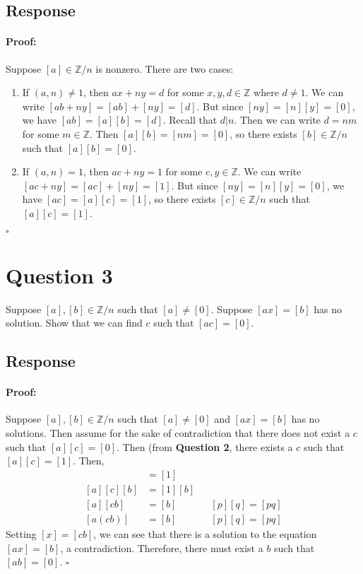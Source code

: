\documentclass [12pt] {article}
\newcommand{\Z}{\mathbb{Z}}
\newenvironment{proof}{\paragraph{Proof:}}{\hfill$\square$}
\begin{document}
\subsection*{Response}
\begin{proof}
    Suppose $[a] \in \Z/n$ is nonzero. There are two cases:
    \begin{enumerate}[label=\it{Case \roman*:},leftmargin=*]
        \item If $(a, n) \neq 1$, then $ax + ny = d$ for some $x, y, d \in \Z$ where $d \neq 1$. 
            We can write $[ab + ny] = [ab] + [ny] = [d]$. But since $[ny] = [n][y] = [0]$, we have
            $[ab] = [a][b] = [d]$. Recall that $d | n$. Then we can write $d = nm$ for some 
            $m \in \Z$. Then $[a][b] = [nm] = [0]$, so there exists $[b] \in \Z/n$ such that
            $[a][b] = [0]$.
        \item If $(a, n) = 1$, then $ac + ny = 1$ for some $c, y \in \Z$. We can write
            $[ac + ny] = [ac] + [ny] = [1]$. But since $[ny] = [n][y] = [0]$, we have
            $[ac] = [a][c] = [1]$, so there exists $[c] \in \Z/n$ such that $[a][c] = [1]$.
    \end{enumerate}
\end{proof}
\newpage

\section*{Question 3}
Suppose $[a],[b]\in\Z/n$ such that $[a]\neq [0]$. Suppose $[ax]=[b]$ has no solution. Show that we 
can find $c$ such that $[ac]=[0]$. 

\subsection*{Response}
\begin{proof}
    Suppose $[a], [b] \in \Z/n$ such that $[a] \neq [0]$ and $[ax] = [b]$ has no solutions. Then
    assume for the sake of contradiction that there does not exist a $c$ such that $[a][c] = [0]$.
    Then (from \textbf{Question 2}, there exists a $c$ such that $[a][c] = [1]$. Then,
    \begin{align*}
        [a][c] &= [1] \\
        [a][c][b] &= [1][b] \\
        [a][cb] &= [b] && [p][q] = [pq] \\
        [a(cb)] &= [b] && [p][q] = [pq]
    \end{align*}
    Setting $[x] = [cb]$, we can see that there is a solution to the equation $[ax] = [b]$, a 
    contradiction. Therefore, there must exist a $b$ such that $[ab] = [0]$.
\end{proof}
\newpage
\end{document}
